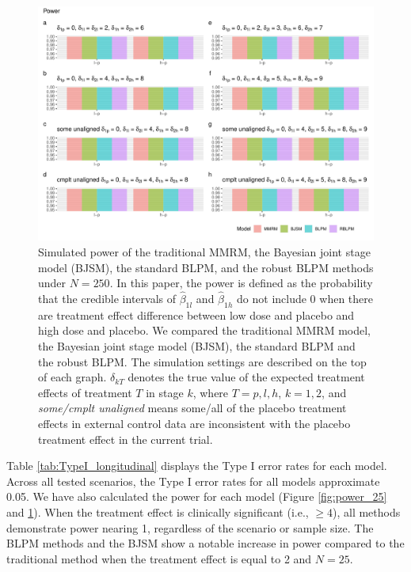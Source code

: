 \begin{figure}
\centerline{\includegraphics[width=\textwidth]{chapters/figures/CRpower_250.pdf}}
\caption{Simulated power of the traditional MMRM, the Bayesian joint stage model (BJSM), the standard BLPM, and the robust BLPM methods under $N = 250$. In this paper, the power is defined as the probability that the credible intervals of $\hat{\beta}_{1l}$ and $\hat{\beta}_{1h}$ do not include 0 when there are treatment effect difference between low dose and placebo and high dose and placebo. We compared the traditional MMRM model, the Bayesian joint stage model (BJSM), the standard BLPM and the robust BLPM. The simulation settings are described on the top of each graph. $\delta_{kT}$ denotes the true value of the expected treatment effects of treatment $T$ in stage $k$, where $T = p, l, h$, $k = 1, 2$, and \emph{some/cmplt unaligned} means some/all of the placebo treatment effects in external control data are inconsistent with the placebo treatment effect in the current trial.}
\label{fig:power_250}
\end{figure}

Table \ref{tab:TypeI_longitudinal} displays the Type I error rates for each model. Across all tested scenarios, the Type I error rates for all models approximate 0.05. We have also calculated the power for each model (Figure \ref{fig:power_25} and \ref{fig:power_250}). When the treatment effect is clinically significant (i.e., \(\geqslant 4\)), all methods demonstrate power nearing 1, regardless of the scenario or sample size. The \ac{BLPM} methods and the \ac{BJSM} show a notable increase in power compared to the traditional method when the treatment effect is equal to 2 and \(N = 25\).



